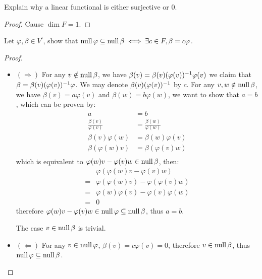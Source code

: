\documentclass[../main.tex]{subfiles}
\begin{document}
\begin{exercise}
  Explain why a linear functional is either surjective or $0$.
\end{exercise}
\begin{proof}
  Cause $\dim F = 1$.
\end{proof}

\setcounter{exercise}{5}
\begin{exercise}
  Let $\varphi, \beta \in V^\prime$, show that $\operatorname{null} \varphi \subseteq \operatorname{null} \beta \iff \exists c \in F, \beta = c \varphi$.
\end{exercise}
\begin{proof}
  ~
  \begin{itemize}
    \item $(\Rightarrow)$ For any $v \notin \operatorname{null} \beta$, we have $\beta(v) = \beta(v)(\varphi(v))^{-1}\varphi(v)$
          we claim that $\beta = \beta(v)(\varphi(v))^{-1}\varphi$. We may denote $\beta(v)(\varphi(v))^{-1}$ by $c$.
          For any $v, w \notin \operatorname{null} \beta$, we have $\beta(v) = a\varphi(v)$  and $\beta(w) = b\varphi(w)$,
          we want to show that $a = b$, which can be proven by:
          \begin{align*}
            a & = b \\
            \frac{\beta(v)}{\varphi(v)} & = \frac{\beta(w)}{\varphi(w)} \\
            \beta(v)\varphi(w) & = \beta(w)\varphi(v) \\
            \beta(\varphi(w) v) & = \beta(\varphi(v) w) \\
          \end{align*}
          which is equivalent to $\varphi(w) v - \varphi(v) w \in \operatorname{null} \beta$, then:
          \begin{align*}
             & \varphi(\varphi(w) v - \varphi(v) w) \\
            =& \varphi(\varphi(w) v) - \varphi(\varphi(v) w) \\
            =& \varphi(w) \varphi(v) - \varphi(v) \varphi(w) \\
            =& 0
          \end{align*}
          therefore $\varphi(w) v - \varphi(v) w \in \operatorname{null} \varphi \subseteq \operatorname{null} \beta$,
          thus $a = b$.

          The case $v \in \operatorname{null} \beta$ is trivial.
    \item $(\Leftarrow)$ For any $v \in \operatorname{null} \varphi$, $\beta(v) = c \varphi(v) = 0$,
          therefore $v \in \operatorname{null} \beta$, thus $\operatorname{null} \varphi \subseteq \operatorname{null} \beta$.
  \end{itemize}
\end{proof}
\end{document}
